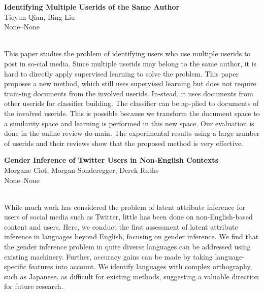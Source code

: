 \documentclass[twoside,makeidx]{book}
\begin{document}
\par\vspace{2em}\noindent%
\begin{minipage}{\linewidth}%
\begin{center}
\textbf{\normalsize Identifying Multiple Userids of the Same Author}\\
\normalsize  Tieyun Qian,  Bing Liu\\
{\small None--None}\\
\end{center}
\end{minipage}\\[0.5em]
\nopagebreak%
\noindent%
{\small This paper studies the problem of identifying users who use multiple userids to post in so-cial media. Since multiple userids may belong to the same author, it is hard to directly apply supervised learning to solve the problem. This paper proposes a new method, which still uses supervised learning but does not require train-ing documents from the involved userids. In-stead, it uses documents from other userids for classifier building. The classifier can be ap-plied to documents of the involved userids. This is possible because we transform the document space to a similarity space and learning is performed in this new space. Our evaluation is done in the online review do-main. The experimental results using a large number of userids and their reviews show that the proposed method is very effective.}
\par\vspace{2em}\noindent%
\begin{minipage}{\linewidth}%
\begin{center}
\textbf{\normalsize Gender Inference of Twitter Users in Non-English Contexts}\\
\normalsize  Morgane Ciot,  Morgan Sonderegger,  Derek Ruths\\
{\small None--None}\\
\end{center}
\end{minipage}\\[0.5em]
\nopagebreak%
\noindent%
{\small While much work has considered the problem of latent attribute inference for users of social media such as Twitter, little has been done on non-English-based content and users.  Here, we conduct the first assessment of latent attribute inference in languages beyond English, focusing on gender inference. We find that the gender inference problem in quite diverse languages can be addressed using existing machinery. Further, accuracy gains can be made by taking language-specific features into account.  We identify languages with complex orthography, such as Japanese, as difficult for existing methods, suggesting a valuable direction for future research.}
\end{document}
